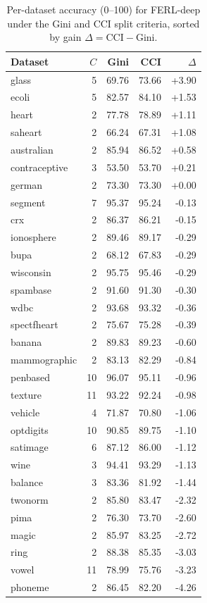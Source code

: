 \begin{table}[t]
\centering
\small
\caption{Per-dataset accuracy (0--100) for FERL-deep under the Gini and CCI split criteria, sorted by gain $\Delta=\mathrm{CCI}-\mathrm{Gini}$.}
\label{tab:cci-gini-learned-full}
\begin{tabular}{@{}lrrrr@{}}
\toprule
Dataset & $C$ & Gini & CCI & $\Delta$\\
\midrule
glass & 5 & 69.76 & 73.66 & +3.90\\
ecoli & 5 & 82.57 & 84.10 & +1.53\\
heart & 2 & 77.78 & 78.89 & +1.11\\
saheart & 2 & 66.24 & 67.31 & +1.08\\
australian & 2 & 85.94 & 86.52 & +0.58\\
contraceptive & 3 & 53.50 & 53.70 & +0.21\\
german & 2 & 73.30 & 73.30 & +0.00\\
segment & 7 & 95.37 & 95.24 & -0.13\\
crx & 2 & 86.37 & 86.21 & -0.15\\
ionosphere & 2 & 89.46 & 89.17 & -0.29\\
bupa & 2 & 68.12 & 67.83 & -0.29\\
wisconsin & 2 & 95.75 & 95.46 & -0.29\\
spambase & 2 & 91.60 & 91.30 & -0.30\\
wdbc & 2 & 93.68 & 93.32 & -0.36\\
spectfheart & 2 & 75.67 & 75.28 & -0.39\\
banana & 2 & 89.83 & 89.23 & -0.60\\
mammographic & 2 & 83.13 & 82.29 & -0.84\\
penbased & 10 & 96.07 & 95.11 & -0.96\\
texture & 11 & 93.22 & 92.24 & -0.98\\
vehicle & 4 & 71.87 & 70.80 & -1.06\\
optdigits & 10 & 90.85 & 89.75 & -1.10\\
satimage & 6 & 87.12 & 86.00 & -1.12\\
wine & 3 & 94.41 & 93.29 & -1.13\\
balance & 3 & 83.36 & 81.92 & -1.44\\
twonorm & 2 & 85.80 & 83.47 & -2.32\\
pima & 2 & 76.30 & 73.70 & -2.60\\
magic & 2 & 85.97 & 83.25 & -2.72\\
ring & 2 & 88.38 & 85.35 & -3.03\\
vowel & 11 & 78.99 & 75.76 & -3.23\\
phoneme & 2 & 86.45 & 82.20 & -4.26\\
\bottomrule
\end{tabular}
\end{table}
